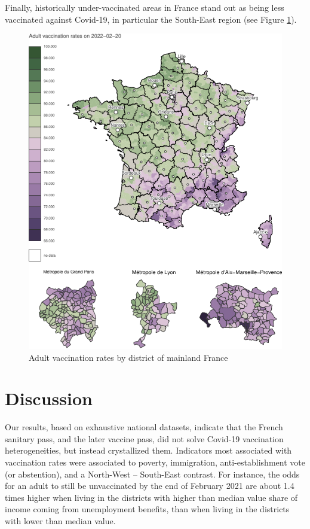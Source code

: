 \documentclass[
]{article}
\begin{document}
Finally, historically under-vaccinated areas in France stand out as being less vaccinated against Covid-19, in particular the South-East region (see Figure \ref{fig:figMap}).

\begin{figure}
\centering
\includegraphics{ms_files/figure-latex/figMap-1.pdf}
\caption{\label{fig:figMap}Adult vaccination rates by district of mainland France}
\end{figure}

\hypertarget{discussion}{%
\section{Discussion}\label{discussion}}

Our results, based on exhaustive national datasets, indicate that the French sanitary pass, and the later vaccine pass, did not solve Covid-19 vaccination heterogeneities, but instead crystallized them.
Indicators most associated with vaccination rates were associated to poverty, immigration, anti-establishment vote (or abstention), and a North-West -- South-East contrast. For instance, the odds for an adult to still be unvaccinated by the end of February 2021 are about 1.4 times higher when living in the districts with higher than median value share of income coming from unemployment benefits, than when living in the districts with lower than median value.
\end{document}
